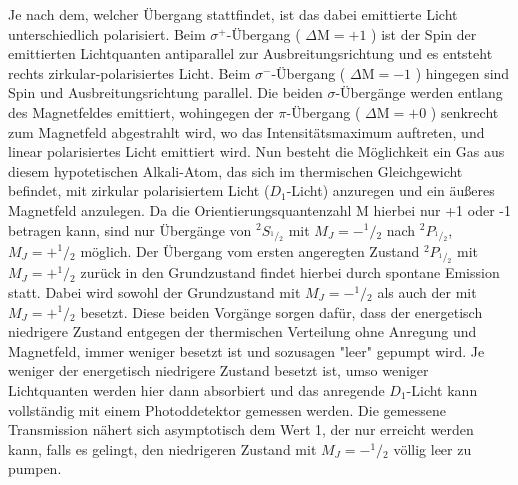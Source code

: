 Je nach dem, welcher Übergang stattfindet, ist das dabei emittierte Licht unterschiedlich polarisiert.
Beim $\sigma^+$-Übergang ( $\Delta \text{M} = +1$ ) ist der Spin der emittierten Lichtquanten antiparallel zur Ausbreitungsrichtung und es entsteht rechts zirkular-polarisiertes Licht. Beim $\sigma^-$-Übergang ( $\Delta \text{M} = -1$ ) hingegen sind Spin und Ausbreitungsrichtung parallel. Die beiden $\sigma$-Übergänge werden entlang des Magnetfeldes emittiert, wohingegen der $\pi$-Übergang ( $\Delta \text{M} = +0$ ) senkrecht zum Magnetfeld abgestrahlt wird, wo das Intensitätsmaximum auftreten, und linear polarisiertes Licht emittiert wird.
Nun besteht die Möglichkeit ein Gas aus diesem hypotetischen Alkali-Atom, das sich im thermischen Gleichgewicht befindet,
mit zirkular polarisiertem Licht ($D_1$-Licht) anzuregen und ein äußeres Magnetfeld anzulegen. Da die Orientierungsquantenzahl M hierbei nur +1 oder -1 betragen kann, sind nur Übergänge von ${}^2S_{^1\!/\!_2}$ mit  $M_J=-^1\!/\!_2$ nach ${}^2P_{^1\!/\!_2}$, $M_J=+^1\!/\!_2$ möglich.
Der Übergang vom ersten angeregten Zustand ${}^2P_{^1\!/\!_2}$ mit $M_J=+^1\!/\!_2$ zurück in den Grundzustand findet hierbei durch spontane
Emission statt. Dabei wird sowohl der Grundzustand mit $M_J=-^1\!/\!_2$
als auch der mit $M_J=+^1\!/\!_2$ besetzt. Diese beiden Vorgänge sorgen dafür, dass der energetisch niedrigere Zustand entgegen der thermischen Verteilung ohne Anregung und Magnetfeld, immer weniger besetzt ist und sozusagen "leer" gepumpt wird.
Je weniger der energetisch niedrigere Zustand besetzt ist, umso weniger Lichtquanten werden hier dann absorbiert und das anregende $D_1$-Licht
kann vollständig mit einem Photoddetektor gemessen werden. Die gemessene
Transmission nähert sich asymptotisch dem Wert 1, der nur erreicht werden kann, falls es gelingt, den niedrigeren Zustand mit $M_J=-^1\!/\!_2$ völlig leer zu pumpen.

